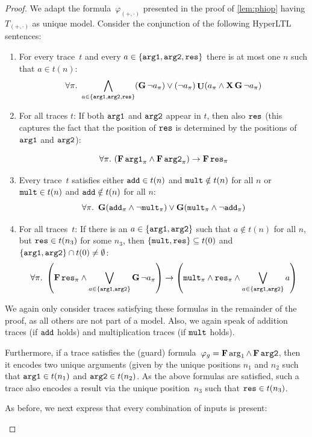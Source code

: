 \documentclass[dvipsnames,10pt,a4paper]{amsart}
\theoremstyle{definition}
\theoremstyle{remark}
\newcommand{\set}[1]{\{#1\}}
\renewcommand{\phi}{\varphi}
\newcommand{\F}{\mathop{\mathbf{F}\vphantom{a}}\nolimits}
\newcommand{\G}{\mathop{\mathbf{G}\vphantom{a}}\nolimits}
\DeclareMathOperator{\U}{\mathbf{U}}
\newcommand{\X}{\mathop{\mathbf{X}\vphantom{a}}\nolimits}
\newcommand{\hyltl}{{HyperLTL}\xspace}
\newcommand\argl{\textup{\texttt{arg1}}}
\newcommand\argr{\textup{\texttt{arg2}}}
\newcommand\res{\textup{\texttt{res}}}
\newcommand\add{\textup{\texttt{add}}}
\newcommand\mult{\textup{\texttt{mult}}}
\newcommand\phiop{\varphi_{({+},{\cdot})}}
\newcommand\Top{T_{({+},{\cdot})}}
\renewcommand{\phi}{\varphi}
\begin{document}
\begin{proof}
We adapt the formula~$\phiop$ presented in the proof of \autoref{lem:phiop} having $\Top$ as unique model.
Consider the conjunction of the following \hyltl sentences:
\begin{enumerate}

	\item For every trace~$t$ and every $a \in \set{\argl,\argr,\res}$ there is at most one $n$ such that $a \in t(n)$:
\[
		\forall \pi.\ \bigwedge_{a \in \set{\argl,\argr,\res}}(\G\neg a_\pi) \vee (\neg a_\pi)\U (a_\pi \wedge \X\G\neg a_\pi)
\]
\item For all traces $t$: If both $\argl$ and $\argr$ appear in $t$, then also $\res$ (this captures the fact that the position of $\res$ is determined by the positions of $\argl$ and $\argr$):

\[
\forall \pi.\ (\F\argl_\pi \wedge \F\argr_\pi) \rightarrow \F\res_\pi\]

	\item Every trace~$t$ satisfies either $\add \in t(n)$ and $\mult\notin t(n)$ for all $n$ or $\mult \in t(n)$ and $\add \notin t(n)$ for all $n$:
	\[
	\forall \pi.\ \G(\add_\pi\wedge\neg\mult_\pi) \vee \G(\mult_\pi\wedge\neg\add_\pi)
	\]	
	
	\item For all traces~$t$: If there is an $a \in \set{\argl,\argr}$ such that $a \notin t(n)$ for all $n$, but $\res \in t(n_3)$ for some $n_3$, then $\set{\mult, \res} \subseteq t(0)$ and $\set{\argl,\argr} \cap t(0) \neq \emptyset$:
	\[
	\forall \pi.\ \left(\F\res_\pi \wedge \bigvee_{a \in \set{\argl,\argr}}\G\neg a_\pi\right)\rightarrow \left(\mult_\pi \wedge \res_\pi \wedge \bigvee_{a \in \set{\argl,\argr}}a\right)
	\]

\end{enumerate}
 We again only consider traces satisfying these formulas in the remainder of the proof, as all others are not part of a model. Also, we again speak of addition traces (if $\add$ holds) and multiplication traces (if $\mult $ holds).
 
	Furthermore, if a trace satisfies the (guard) formula~$\phi_g = \F \arg_1 \wedge \F\argr$, then it encodes two unique arguments (given by the unique positions $n_1$ and $n_2$ such that $\argl\in t(n_1)$ and $\argr\in t(n_2)$. As the above formulas are satisfied, such a trace also encodes a result via the unique position~$n_3$ such that $\res \in t(n_3)$. 
	
As before, we next express that every combination of inputs is present:
\begin{enumerate}
\setcounter{enumi}{4}
	

\end{enumerate}
\end{proof}
\end{document}

